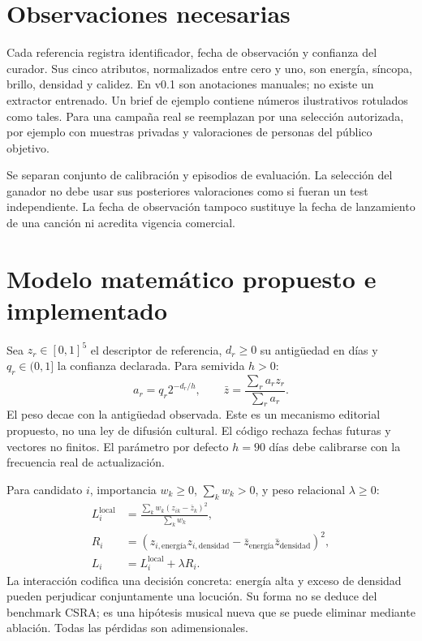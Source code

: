 \documentclass[11pt,a4paper]{article}
\begin{document}
\section{Observaciones necesarias}
Cada referencia registra identificador, fecha de observación y confianza del curador. Sus cinco atributos, normalizados entre cero y uno, son energía, síncopa, brillo, densidad y calidez. En v0.1 son anotaciones manuales; no existe un extractor entrenado. Un brief de ejemplo contiene números ilustrativos rotulados como tales. Para una campaña real se reemplazan por una selección autorizada, por ejemplo con muestras privadas y valoraciones de personas del público objetivo.

Se separan conjunto de calibración y episodios de evaluación. La selección del ganador no debe usar sus posteriores valoraciones como si fueran un test independiente. La fecha de observación tampoco sustituye la fecha de lanzamiento de una canción ni acredita vigencia comercial.

\newpage
\section{Modelo matemático propuesto e implementado}
Sea $z_r\in[0,1]^5$ el descriptor de referencia, $d_r\geq0$ su antigüedad en días y $q_r\in(0,1]$ la confianza declarada. Para semivida $h>0$:
\begin{equation}
 a_r=q_r2^{-d_r/h},\qquad \bar z=\frac{\sum_r a_rz_r}{\sum_r a_r}.
\end{equation}
El peso decae con la antigüedad observada. Este es un mecanismo editorial propuesto, no una ley de difusión cultural. El código rechaza fechas futuras y vectores no finitos. El parámetro por defecto $h=90$ días debe calibrarse con la frecuencia real de actualización.

Para candidato $i$, importancia $w_k\geq0$, $\sum_kw_k>0$, y peso relacional $\lambda\geq0$:
\begin{align}
 L_i^{\mathrm{local}}&=\frac{\sum_kw_k(z_{ik}-\bar z_k)^2}{\sum_kw_k},\\
 R_i&=(z_{i,\mathrm{energía}}z_{i,\mathrm{densidad}}-
 \bar z_{\mathrm{energía}}\bar z_{\mathrm{densidad}})^2,\\
 L_i&=L_i^{\mathrm{local}}+\lambda R_i.
\end{align}
La interacción codifica una decisión concreta: energía alta y exceso de densidad pueden perjudicar conjuntamente una locución. Su forma no se deduce del benchmark CSRA; es una hipótesis musical nueva que se puede eliminar mediante ablación. Todas las pérdidas son adimensionales.
\end{document}
